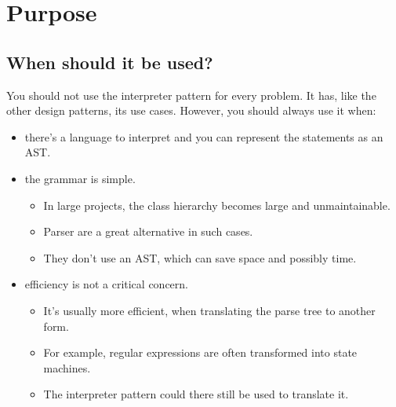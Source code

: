 \chapter{Purpose}

\section{When should it be used?}
\label{sec:when-to-use}

You should not use the interpreter pattern for every problem. It has, like the other design patterns, its use cases. However, you should always use it when:  
\begin{itemize}
    \item there's a language to interpret and you can represent the statements as an AST.

    \item the grammar is simple.
    \begin{itemize}
        \item In large projects, the class hierarchy becomes large and unmaintainable. 
        \item Parser are a great alternative in such cases.
        \item They don't use an AST, which can save space and possibly time.
    \end{itemize}

    \item efficiency is not a critical concern.
    \begin{itemize}
        \item It's usually more efficient, when translating the parse tree to another form.
        \item For example, regular expressions are often transformed into state machines. 
        \item The interpreter pattern could there still be used to translate it. 
    \end{itemize}
\end{itemize}

